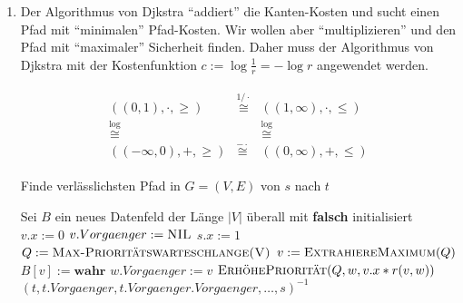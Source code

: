 \begin{solution}

\begin{enumerate}[label = \alph*]

    \item \phantom{}


    Der Algorithmus von Djkstra \enquote{addiert} die Kanten-Kosten und sucht einen Pfad mit \enquote{minimalen} Pfad-Kosten.
    Wir wollen aber \enquote{multiplizieren} und den Pfad mit \enquote{maximaler} Sicherheit finden.
    Daher muss der Algorithmus von Djkstra mit der Kostenfunktion $c := \log \frac{1}{r} = -\log r$ angewendet werden.

    \begin{align*}
        \begin{matrix}
            ((0, 1), \cdot, \geq)   & \stackrel{1 / \cdot}{\cong} & ((1, \infty), \cdot, \leq) \\
            \stackrel{\log}{\cong}  &                             & \stackrel{\log}{\cong}     \\
            ((-\infty, 0), +, \geq) & \stackrel{- \cdot}{\cong}   & ((0, \infty), +, \leq)
        \end{matrix}
    \end{align*}

    \begin{algorithm}
    	\caption{Finde verlässlichsten Pfad in $G = (V, E)$ von $s$ nach $t$}
    	\begin{algorithmic}[1]
    		\State Sei $B$ ein neues Datenfeld der Länge $|V|$ überall mit \textbf{falsch} initialisiert
	    		\State $v.x := 0$
	    		\State $v.Vorgaenger := \textsc{NIL}$
    		\EndFor
    		\State $s.x := 1$
    		\State $Q := \textsc{Max-Prioritätswarteschlange(V)}$
	    		\State $v := \textsc{ExtrahiereMaximum}(Q)$
	    		\State $B[v] := \textbf{wahr}$
			    		\State $w.Vorgaenger := v$
			    		\State $\textsc{ErhöhePriorität}(Q,w,v.x \ast r(v,w))$
		    		\EndIf
	    		\EndFor
    		\EndWhile
    		\State \Return $(t, t.Vorgaenger, t.Vorgaenger.Vorgaenger, \dots, s)^{-1}$
    		\EndProcedure
    	\end{algorithmic}
    \end{algorithm}


\end{enumerate}
\end{solution}
